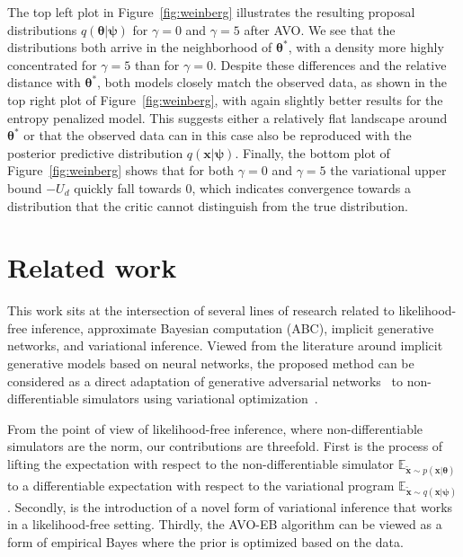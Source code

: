\documentclass[twocolumn,superscriptaddress,aps]{revtex4-1}
\newcommand{\qxpsi}{q(\mathbf{x}|\bfpsi)}
\newcommand{\bftheta}{{\bm \theta}}
\newcommand{\bfpsi}{{\bm \psi}}
\newcommand{\bfx}{\mathbf{x}}
\newcommand{\bfz}{\mathbf{z}}
\theoremstyle{plain}
\begin{document}
The top left plot in Figure~\ref{fig:weinberg} illustrates the resulting
proposal distributions $q(\bftheta|\bfpsi)$ for $\gamma=0$ and $\gamma=5$ after
AVO. We see that the distributions both arrive
in the neighborhood of $\bftheta^*$, with a density  more highly concentrated for
$\gamma=5$ than for $\gamma=0$.  Despite these differences and the relative
distance with $\bftheta^*$, both models closely match the observed data, as shown
in the top right plot of  Figure~\ref{fig:weinberg}, with again slightly better
results for the entropy penalized model. This suggests either a relatively flat
landscape around $\bftheta^*$ or that the observed data can in this case also be
reproduced with the posterior predictive distribution $\qxpsi$.
Finally, the bottom plot of Figure~\ref{fig:weinberg} shows that for both
$\gamma=0$ and $\gamma=5$ the variational upper bound $-U_d$ quickly fall
towards $0$, which indicates  convergence towards a distribution that the critic
cannot distinguish from the true distribution.



\section{Related work}

This work sits at the intersection of several lines of research related to
likelihood-free inference, approximate Bayesian computation (ABC),
implicit generative networks, and variational inference.
Viewed from the literature around implicit generative models based on neural networks,
the proposed method can be considered as a direct adaptation of
generative adversarial networks~\citep{goodfellow2014generative,2017arXiv170104862A, 2017arXiv170107875A} to
non-differentiable simulators using variational optimization~\cite{2012arXiv1212.4507S,staines2013optimization}.

From the point of view of likelihood-free inference, where  non-differentiable
simulators are the norm, our contributions are threefold. First is the process
of lifting the expectation with respect to the non-differentiable simulator
$\mathbb{E}_{\tilde{\bfx} \sim p(\bfx | \bftheta)}$ to a differentiable
expectation with respect to the variational program $\mathbb{E}_{\tilde{\bfx}
\sim q(\bfx | \bfpsi)}$. Secondly, is the introduction of a novel form of
variational inference that works in a likelihood-free setting. Thirdly, the
AVO-EB algorithm can be viewed as a form of empirical Bayes where the prior is
optimized based on the data.
\end{document}
